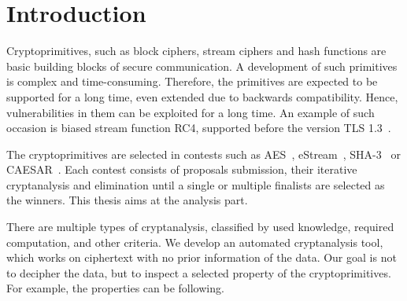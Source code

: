 \documentclass[
    digital,    %
    oneside,    %
    color,
    11pt,
    nocover,
    notable,
    nolof,
    nolot,
]{fithesis3}
\begin{document}
\setlength{\parskip}{5pt}
\setlength{\parindent}{0pt}


\chapter{Introduction}
\label{chap:introduction}


Cryptoprimitives, such as block ciphers, stream ciphers and hash functions are basic building blocks of secure communication. A development of such primitives is complex and time-consuming. Therefore, the primitives are expected to be supported for a long time, even extended due to backwards compatibility. Hence, vulnerabilities in them can be exploited for a long time. An example of such occasion is biased stream function RC4, supported before the version TLS 1.3~\cite{dierks2008transport}.

The cryptoprimitives are selected in contests such as AES~\cite{aes-competition}, eStream~\cite{estream-competition}, SHA-3~\cite{sha3-competition} or CAESAR~\cite{caesar-competition}. Each contest consists of proposals submission, their iterative cryptanalysis and elimination until a single or multiple finalists are selected as the winners. This thesis aims at the analysis part.

There are multiple types of cryptanalysis, classified by used knowledge, required computation, and other criteria. We develop an automated cryptanalysis tool, which works on ciphertext with no prior information of the data. Our goal is not to decipher the data, but to inspect a selected property of the cryptoprimitives. For example, the properties can be following.
\end{document}
